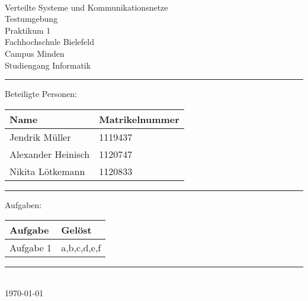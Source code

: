 


\begin{titlepage}
   \mbox{}\vspace{5\baselineskip}\\
   \sffamily\huge
   \centering
   {\Huge Verteilte Systeme und Kommunikationsnetze} \\
  Testumgebung \\ \normalsize Praktikum  1
   \vspace{3\baselineskip}\\
   \rmfamily\Large
  Fachhochschule Bielefeld \\
  Campus Minden \\
  Studiengang Informatik
   \vspace{2\baselineskip}\\
\noindent\rule{15cm}{0.4pt}
Beteiligte Personen:
\begin{table}[H]
	\tablestyle
	\begin{tabular}{*{2}{v{0.45\textwidth}}}
		\hline
		\textbf{Name} &
		\textbf{Matrikelnummer} \tabularnewline
		\hline
		 Jendrik Müller  & 1119437 \tabularnewline
		Alexander Heinisch  & 1120747 \tabularnewline
		Nikita Lötkemann  & 1120833 \tabularnewline

	\end{tabular}
\end{table}

\centering
\noindent\rule{15cm}{0.4pt}
{\Large Aufgaben:}
\begin{table}[H]
	\tablestyle
	\begin{tabular}{*{2}{v{0.45\textwidth}}}
		\hline
		\textbf{Aufgabe} &
		\textbf{Gelöst} \tabularnewline
		\hline
		Aufgabe 1 & a,b,c,d,e,f \tabularnewline

		
	\end{tabular}
\end{table}
   \noindent\rule{15cm}{0.4pt}
      \vspace{1\baselineskip}\\
   \today
\end{titlepage}

